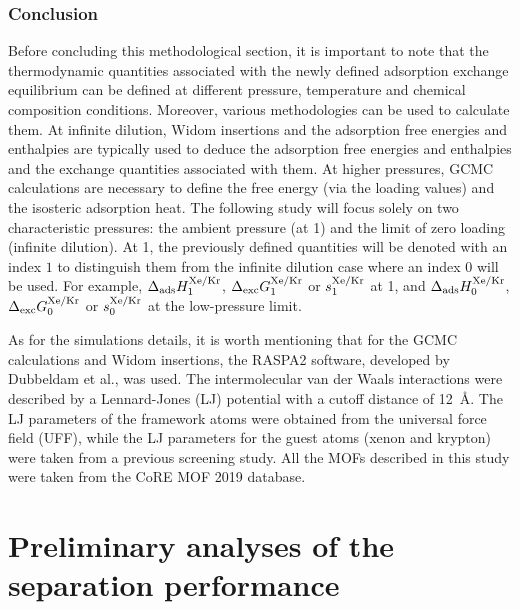 \documentclass[main.tex]{subfiles}
\begin{document}
\subsubsection{Conclusion}

Before concluding this methodological section, it is important to note that the thermodynamic quantities associated with the newly defined adsorption exchange equilibrium can be defined at different pressure, temperature and chemical composition conditions. Moreover, various methodologies can be used to calculate them. At infinite dilution, Widom insertions and the adsorption free energies and enthalpies are typically used to deduce the adsorption free energies and enthalpies and the exchange quantities associated with them. At higher pressures, GCMC calculations are necessary to define the free energy (via the loading values) and the isosteric adsorption heat. The following study will focus solely on two characteristic pressures: the ambient pressure (at \SI{1}{\atm}) and the limit of zero loading (infinite dilution). At \SI{1}{\atm}, the previously defined quantities will be denoted with an index $1$ to distinguish them from the infinite dilution case where an index $0$ will be used. For example, $\Delta_{\text{ads}}H_{\text{1}}^{\text{Xe/Kr}}$, $\Delta_{\text{exc}}G_{\text{1}}^{\text{Xe/Kr}}$ or $s_{\text{1}}^{\text{Xe/Kr}}$ at \SI{1}{\atm}, and $\Delta_{\text{ads}}H_{\text{0}}^{\text{Xe/Kr}}$, $\Delta_{\text{exc}}G_{\text{0}}^{\text{Xe/Kr}}$ or $s_{\text{0}}^{\text{Xe/Kr}}$ at the low-pressure limit. 

As for the simulations details, it is worth mentioning that for the GCMC calculations and Widom insertions, the RASPA2 software, developed by Dubbeldam et al.\autocite{dubbeldam2016}, was used. The intermolecular van der Waals interactions were described by a Lennard-Jones (LJ) potential with a cutoff distance of \SI{12}{\angstrom}. The LJ parameters of the framework atoms were obtained from the universal force field (UFF),\autocite{rappe1992} while the LJ parameters for the guest atoms (xenon and krypton) were taken from a previous screening study.\autocite{Ryan_2010} All the MOFs described in this study were taken from the CoRE MOF 2019 database.\autocite{Chung_2019}


\section{Preliminary analyses of the separation performance}
\end{document}
